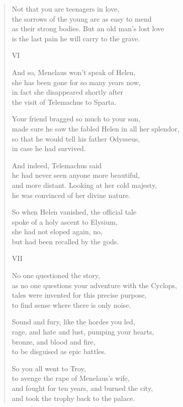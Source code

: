 \documentclass[11pt,a4paper]{article}
\begin{document}
\begin{verse}
Not that you are teenagers in love,\\
the sorrows of the young are as easy to mend\\
as their strong bodies. But an old man's lost love\\
is the last pain he will carry to the grave.

VI

And so, Menelaus won't speak of Helen,\\
she has been gone for so many years now,\\
in fact she disappeared shortly after\\
the visit of Telemachus to Sparta.

Your friend bragged so much to your son,\\
made sure he saw the fabled Helen in all her splendor,\\
so that he would tell his father Odysseus,\\
in case he had survived.

And indeed, Telemachus said\\
he had never seen anyone more beautiful,\\
and more distant. Looking at her cold majesty,\\
he was convinced of her divine nature.

So when Helen vanished, the official tale\\
spoke of a holy ascent to Elysium,\\
she had not eloped again, no,\\
but had been recalled by the gods.

VII

No one questioned the story,\\
as no one questions your adventure with the Cyclops,\\
tales were invented for this precise purpose,\\
to find sense where there is only noise.

Sound and fury, like the hordes you led,\\
rage, and hate and lust, pumping your hearts,\\
bronze, and blood and fire,\\
to be disguised as epic battles.

So you all went to Troy,\\
to avenge the rape of Menelaus's wife,\\
and fought for ten years, and burned the city,\\
and took the trophy back to the palace.


\end{verse}
\end{document}
